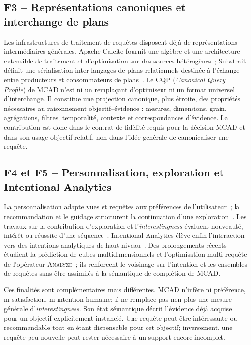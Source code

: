 \documentclass[journal]{IEEEtran}
\begin{document}
\subsection{F3 -- Représentations canoniques et interchange de plans}

Les infrastructures de traitement de requêtes disposent déjà de représentations intermédiaires générales. Apache Calcite fournit une algèbre et une architecture extensible de traitement et d'optimisation sur des sources hétérogènes~\cite{BegoliCalcite2018}; Substrait définit une sérialisation inter-langages de plans relationnels destinée à l'échange entre producteurs et consommateurs de plans~\cite{SubstraitSpec2026}. Le CQP (\emph{Canonical Query Profile}) de MCAD n'est ni un remplaçant d'optimiseur ni un format universel d'interchange. Il constitue une projection canonique, plus étroite, des propriétés nécessaires au raisonnement objectif--évidence : mesures, dimensions, grain, agrégations, filtres, temporalité, contexte et correspondances d'évidence. La contribution est donc dans le contrat de fidélité requis pour la décision MCAD et dans son usage objectif-relatif, non dans l'idée générale de canonicaliser une requête.

\subsection{F4 et F5 -- Personnalisation, exploration et Intentional Analytics}

La personnalisation adapte vues et requêtes aux préférences de l'utilisateur~\cite{GolfarelliRizziBiondi2011,JacobGunklachMaedche2025}; la recommandation et le guidage structurent la continuation d'une exploration~\cite{AligonDSS2015,GunklachNadj2023}. Les travaux sur la contribution d'exploration et l'\emph{interestingness} évaluent nouveauté, intérêt ou réussite d'une séquence~\cite{DjedainiEtAl2019,GkitsakisEtAl2024}. Intentional Analytics élève enfin l'interaction vers des intentions analytiques de haut niveau~\cite{VassiliadisMarcelRizzi2019,FranciaAssess2021}. Des prolongements récents étudient la prédiction de cubes multidimensionnels et l'optimisation multi-requête de l'opérateur \textsc{Analyze}~\cite{FranciaPredict2026,IakovidisVassiliadis2026}; ils renforcent le voisinage sur l'intention et les ensembles de requêtes sans être assimilés à la sémantique de complétion de MCAD.

Ces finalités sont complémentaires mais différentes. MCAD n'infère ni préférence, ni satisfaction, ni intention humaine; il ne remplace pas non plus une mesure générale d'\emph{interestingness}. Son état sémantique décrit l'évidence déjà acquise pour un objectif explicitement instancié. Une requête peut être intéressante ou recommandable tout en étant dispensable pour cet objectif; inversement, une requête peu nouvelle peut rester nécessaire à un support encore incomplet.
\end{document}
